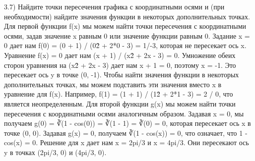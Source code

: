 \documentclass{article}
\begin{document}
\large{3.7) Найдите точки пересечения графика с координатными осями и (при необходимости) найдите
значения функции в некоторых дополнительных точках.}
\linebreak
\linebreak
\small
Для первой функции f(x) мы можем найти точки пересечения с координатными осями, задав значение x равным 0 или значение функции равным 0.
\linebreak
\linebreak
Задание x = 0 дает нам f(0) = (0 + 1) / (0\^2 + 2*0 - 3) = 1/-3, которая не пересекает ось x.
\linebreak
\linebreak
Уравнение f(x) = 0 дает нам (x + 1) / (x\^2 + 2x - 3) = 0. Умножение обеих сторон уравнения на (x\^2 + 2x - 3) дает нам x + 1 = 0, поэтому x = -1. Это пересекает ось y в точке (0, -1).
\linebreak
\linebreak
Чтобы найти значения функции в некоторых дополнительных точках, мы можем подставить эти значения вместо x в уравнение для f(x). Например, f(1) = (1 + 1) / (1\^2 + 2*1 - 3) = 2 / 0, что является неопределенным.
\linebreak
\linebreak
Для второй функции g(x) мы можем найти точки пересечения с координатными осями аналогичным образом. Задавая x = 0, мы получаем g(0) = ∛(1 - cos(0)) = ∛(1 - 1) = ∛(0) = 0, которая пересекает ось x в точке (0, 0).
\linebreak
\linebreak
Задавая g(x) = 0, получаем ∛(1 - cos(x)) = 0, что означает, что 1 - cos(x) = 0. Решение для x дает нам x = 2pi/3 и x = 4pi/3. Они пересекают ось y в точках (2pi/3, 0) и (4pi/3, 0).
\newpage
\newpage
\newpage
\end{document}
